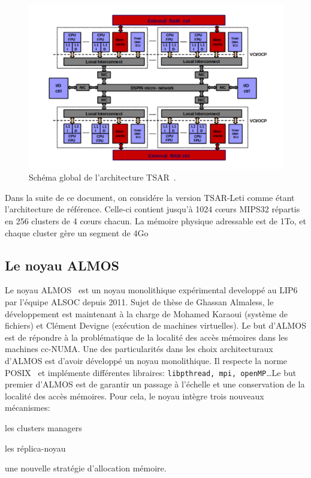       \begin{figure}[ht]
        \centering \includegraphics[scale=0.25]{include/img/tsar.png}
        \caption{Schéma global de l'architecture TSAR~\citep{greiner2009tsar}.}
        \label{fig:tsar}
      \end{figure}

      Dans la suite de ce document, on considére la version TSAR-Leti comme
      étant l'architecture de référence. Celle-ci contient jusqu'à 1024 c\oe urs
      MIPS32 répartis en 256 clusters de 4 c\oe urs chacun. La mémoire physique
      adressable est de 1To, et chaque cluster gère un segment de 4Go


    \subsection{Le noyau ALMOS}
    \label{sec:almos}

      Le noyau ALMOS~\cite{almaless2011almos,almaless2014universite} est un
      noyau monolithique expérimental developpé au LIP6 par l'équipe ALSOC
      depuis 2011. Sujet de thèse de Ghassan Almaless, le développement est
      maintenant à la charge de Mohamed Karaoui (système de fichiers) et Clément
      Devigne (exécution de machines virtuelles). Le but d'ALMOS est de répondre
      à la problématique de la localité des accès mémoires dans les machines
      cc-NUMA. Une des particularités dans les choix architecturaux d'ALMOS est
      d'avoir développé un noyau monolithique. Il respecte la norme
      POSIX~\cite{posix2013} et implémente différentes libraires:
      \texttt{libpthread, mpi, openMP}\ldots Le but premier d'ALMOS est de
      garantir un passage à l'échelle et une conservation de la localité des
      accès mémoires. Pour cela, le noyau intègre trois nouveaux mécanismes:
      \benumline \item les clusters managers \item les réplica-noyau \item une
      nouvelle stratégie d'allocation mémoire\eenumline.


